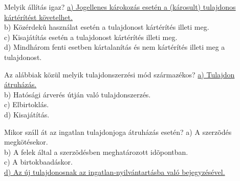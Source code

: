 \begin{frame}

\begin{tcolorbox}[title={118. Kérdés}]
Melyik állítás igaz?
\tcblower
\uline {a) Jogellenes károkozás esetén a (károsult) tulajdonos kártérítést követelhet.}\\
b) Közérdekû használat esetén a tulajdonost kártérítés illeti meg.\\
c) Kisajátítás esetén a tulajdonost kártérítés illeti meg.\\
d) Mindhárom fenti esetben kártalanítás és nem kártérítés illeti meg a tulajdonost.
\end{tcolorbox}

\begin{tcolorbox}[title={119. Kérdés}]
Az alábbiak közül melyik tulajdonszerzési mód származékos?
\tcblower
\uline {a) Tulajdon átruházás.}\\
b) Hatósági árverés útján való tulajdonszerzés.\\
c) Elbirtoklás.\\
d) Kisajátítás.
\end{tcolorbox}

\begin{tcolorbox}[title={120. Kérdés}]
Mikor száll át az ingatlan tulajdonjoga átruházás esetén?
\tcblower
a) A szerzõdés megkötésekor.\\
b) A felek által a szerzõdésben meghatározott idõpontban.\\
c) A birtokbaadáskor.\\
\uline {d) Az új tulajdonosnak az ingatlan-nyilvántartásba való bejegyzésével.}
\end{tcolorbox}

\end{frame}



